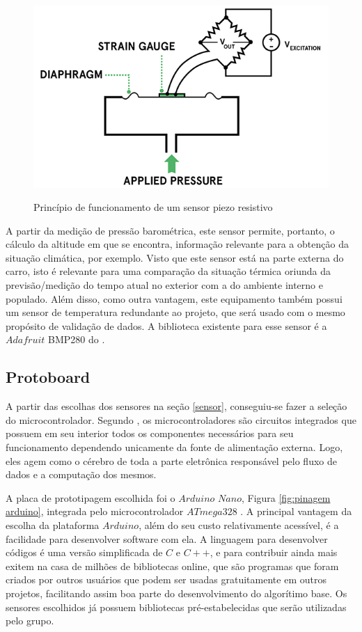 \documentclass[acronym,symbols]{fei}
\begin{document}
\begin{figure}[!htb]
\centering
    \caption{Princípio de funcionamento de um sensor piezo resistivo}
    \includegraphics[width=0.8\linewidth]{Imagens/piezoresist.jpg}
    \label{fig:piezoresist}
\end{figure}

A partir da medição de pressão barométrica, este sensor permite, portanto, o cálculo da altitude em que se encontra, informação relevante para a obtenção da situação climática, por exemplo. Visto que este sensor está na parte externa do carro, isto é relevante para uma comparação da situação térmica oriunda da previsão/medição do tempo atual no exterior com a do ambiente interno e populado. Além disso, como outra vantagem, este equipamento também possui um sensor de temperatura redundante ao projeto, que será usado com o mesmo propósito de validação de dados. A biblioteca existente para esse sensor é a $Adafruit$ BMP280 do \textcite{Adafruit_BMP280}. 

\subsection{Protoboard}

A partir das escolhas dos sensores na seção \ref{sensor}, conseguiu-se fazer a seleção do microcontrolador. Segundo \textcite{kerschbaumer2013microcontroladores}, os microcontroladores são circuitos integrados que possuem em seu interior todos os componentes necessários para seu funcionamento dependendo unicamente da fonte de alimentação externa. Logo, eles agem como o cérebro de toda a parte eletrônica responsável pelo fluxo de dados e a computação dos mesmos.

A placa de prototipagem escolhida foi o $Arduino$ $Nano$, Figura \ref{fig:pinagem arduino}, integrada pelo microcontrolador $ATmega328$ \cite{UNO}. A principal vantagem da escolha da plataforma $Arduino$, além do seu custo relativamente acessível, é a facilidade para desenvolver software com ela. A linguagem para desenvolver códigos é uma versão simplificada de $C$ e $C++$, e para contribuir ainda mais exitem na casa de milhões de bibliotecas online, que são programas que foram criados por outros usuários que podem ser usadas gratuitamente em outros projetos, facilitando assim boa parte do desenvolvimento do algorítimo base. Os sensores escolhidos já possuem bibliotecas pré-estabelecidas que serão utilizadas pelo grupo.
\end{document}
